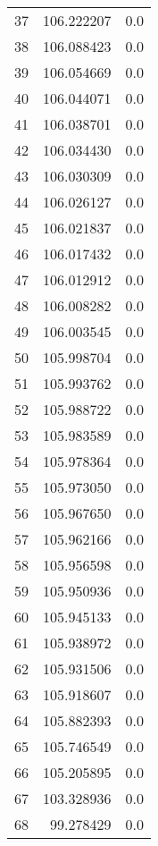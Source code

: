 \begin{tabular}{lrr}
37 &  106.222207 &   0.0 \\
38 &  106.088423 &   0.0 \\
39 &  106.054669 &   0.0 \\
40 &  106.044071 &   0.0 \\
41 &  106.038701 &   0.0 \\
42 &  106.034430 &   0.0 \\
43 &  106.030309 &   0.0 \\
44 &  106.026127 &   0.0 \\
45 &  106.021837 &   0.0 \\
46 &  106.017432 &   0.0 \\
47 &  106.012912 &   0.0 \\
48 &  106.008282 &   0.0 \\
49 &  106.003545 &   0.0 \\
50 &  105.998704 &   0.0 \\
51 &  105.993762 &   0.0 \\
52 &  105.988722 &   0.0 \\
53 &  105.983589 &   0.0 \\
54 &  105.978364 &   0.0 \\
55 &  105.973050 &   0.0 \\
56 &  105.967650 &   0.0 \\
57 &  105.962166 &   0.0 \\
58 &  105.956598 &   0.0 \\
59 &  105.950936 &   0.0 \\
60 &  105.945133 &   0.0 \\
61 &  105.938972 &   0.0 \\
62 &  105.931506 &   0.0 \\
63 &  105.918607 &   0.0 \\
64 &  105.882393 &   0.0 \\
65 &  105.746549 &   0.0 \\
66 &  105.205895 &   0.0 \\
67 &  103.328936 &   0.0 \\
68 &   99.278429 &   0.0 \\
\bottomrule
\end{tabular}
